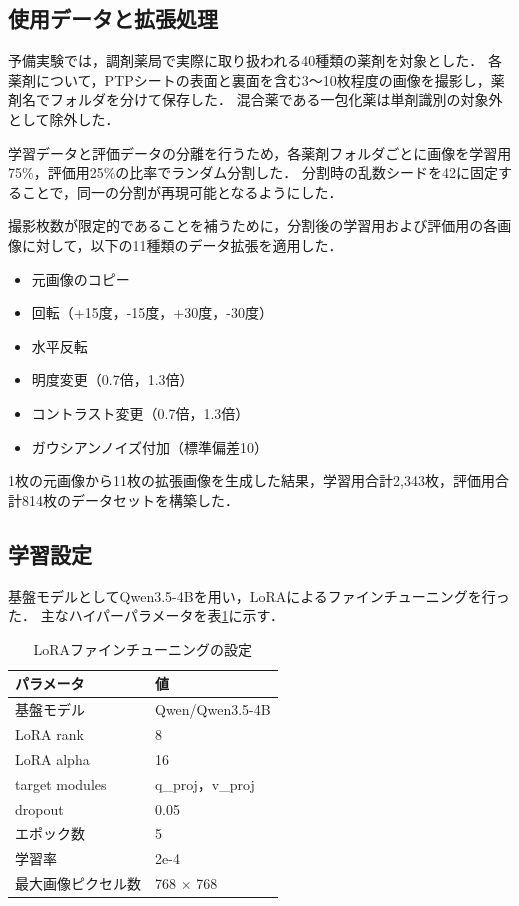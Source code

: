 \documentclass{jsarticle}
\begin{document}
\subsection{使用データと拡張処理}

予備実験では，調剤薬局で実際に取り扱われる40種類の薬剤を対象とした．
各薬剤について，PTPシートの表面と裏面を含む3〜10枚程度の画像を撮影し，薬剤名でフォルダを分けて保存した．
混合薬である一包化薬は単剤識別の対象外として除外した．

学習データと評価データの分離を行うため，各薬剤フォルダごとに画像を学習用75\%，評価用25\%の比率でランダム分割した．
分割時の乱数シードを42に固定することで，同一の分割が再現可能となるようにした．

撮影枚数が限定的であることを補うために，分割後の学習用および評価用の各画像に対して，以下の11種類のデータ拡張を適用した．

\begin{itemize}
  \item 元画像のコピー
  \item 回転（+15度，-15度，+30度，-30度）
  \item 水平反転
  \item 明度変更（0.7倍，1.3倍）
  \item コントラスト変更（0.7倍，1.3倍）
  \item ガウシアンノイズ付加（標準偏差10）
\end{itemize}

1枚の元画像から11枚の拡張画像を生成した結果，学習用合計2,343枚，評価用合計814枚のデータセットを構築した．

\subsection{学習設定}

基盤モデルとしてQwen3.5-4Bを用い，LoRAによるファインチューニングを行った．
主なハイパーパラメータを表\ref{tab:lora_config}に示す．

\begin{table}[h]
\centering
\caption{LoRAファインチューニングの設定}
\label{tab:lora_config}
\begin{tabular}{ll}
\hline
パラメータ & 値 \\
\hline
基盤モデル & Qwen/Qwen3.5-4B \\
LoRA rank & 8 \\
LoRA alpha & 16 \\
target modules & q\_proj，v\_proj \\
dropout & 0.05 \\
エポック数 & 5 \\
学習率 & 2e-4 \\
最大画像ピクセル数 & 768 $\times$ 768 \\
\hline
\end{tabular}
\end{table}
\end{document}
